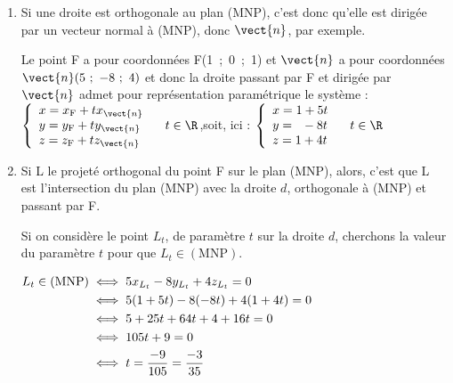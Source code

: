 \begin{enumerate}
\begin{enumerate}
C'est donc un vecteur normal de (MNP).

\item On en déduit que le plan (MNP) a une équation cartésienne de la forme $5x - 8y + 4z + d= 0$, où $d$ est un nombre réel.

Comme $\mathrm{M} \in (\mathrm{MNP})$, $d$ est tel que :

$\aligned 5x_\mathrm{M} - 8y_\mathrm{M} + 4z_\mathrm{M} + d= 0
&\iff 5\times 1 - 8\times 1 + 4\times \dfrac{3}{4} + d =0\\
&\iff 5 - 8 + 3 + d=0\\
&\iff d = 0\\ \endaligned$

Une équation cartésienne de (MNP) est donc bien $5x-8y+4z=0$.
	\end{enumerate}
\item Si une droite est orthogonale au plan (MNP), c'est donc qu'elle est dirigée par un vecteur normal à (MNP), donc $\vect{n}$, par exemple.

Le point F a pour coordonnées F(1~;~0~;~1) et $\vect{n}$ a pour coordonnées $\vect{n}(5~;~-8~;~4)$ et donc la droite passant par F et dirigée par $\vect{n}$ admet pour représentation paramétrique le système : $\left\{\begin{array}{l} x=x_{\mathrm{F}} + tx_{\vect{n}}\\
	y=y_{\mathrm{F}} + ty_{\vect{n}}\\
	z=z_{\mathrm{F}} + tz_{\vect{n}} \end{array}\right.\quad t \in \R $,\qquad  soit, ici : $\left\{\begin{array}{l} x=1 + 5t\\
	y=\phantom{1}-8t\\
	z=1+4t \end{array}\right.\quad t \in \R $

\item Si L le projeté orthogonal du point F sur le plan (MNP), alors, c'est que L est l'intersection du plan (MNP) avec la droite $d$, orthogonale à (MNP) et passant par F.

Si on considère le point $L_t$, de paramètre $t$ sur la droite $d$, cherchons la valeur du paramètre $t$ pour que $L_t \in (\mathrm{MNP})$.

$ \aligned L_t \in (\mathrm{MNP}) &\iff 5x_{L_t} - 8y_{L_t} + 4z_{L_t} = 0\\
		&\iff 5(1 + 5t) - 8(-8t) + 4(1 + 4t) = 0\\
		&\iff 5 + 25t +64t + 4 + 16 t = 0\\
		&\iff 105t + 9 = 0\\
		&\iff t = \dfrac{-9}{105} = \dfrac{-3}{35}	\\ \endaligned$


\end{enumerate}
